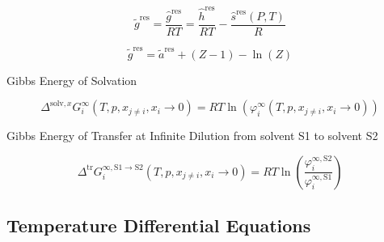 \documentclass[12pt, letterpaper]{article}
\begin{document}
\begin{equation}
    \tilde{g}^{\mathrm{res}}=\frac{\hat{g}^{\mathrm{res}}}{RT}=\frac{\hat{h}^{\mathrm{res}}}{RT}-\frac{\hat{s}^{\mathrm{res}}(P,T)}{R}
    \label{eq:g_res_from_hs}
\end{equation}


\begin{equation}
    \tilde{g}^{\mathrm{res}}=\tilde{a}^{\mathrm{res}}+(Z-1)-\ln(Z)
    \label{eq:g_res_from_ares}
\end{equation}

Gibbs Energy of Solvation


\begin{equation}
    \Delta^{\mathrm{solv},x}G_{i}^{\infty}(T,p,x_{j\neq i},x_{i}\to0)=RT\ln(\varphi_{i}^{\infty}(T,p,x_{j\neq i},x_{i}\to0))
    \label{eq:delta_g_solv_inf_x}
\end{equation}

Gibbs Energy of Transfer at Infinite Dilution from solvent S1 to solvent S2

\begin{equation}
    \Delta^{\mathrm{tr}}G_{i}^{\infty,\mathrm{S}1\to\mathrm{S}2}(T,p,x_{j\neq i},x_{i}\rightarrow0)=RT\ln\left(\frac{\varphi_{i}^{\infty,\mathrm{S}2}}{\varphi_{i}^{\infty,\mathrm{S}1}}\right)
    \label{eq:delta_g_transfer_inf}
\end{equation}

\subsection{Temperature Differential Equations}
\end{document}
